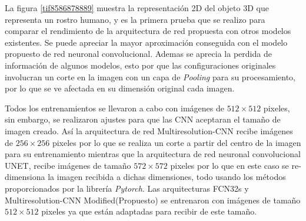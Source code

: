 \documentclass[10pt,letterpaper]{article}
\begin{document}
La figura \ref{tif8586878889} muestra la representación 2D del objeto 3D que representa un rostro humano, y es la primera prueba que se realizo para comparar el rendimiento de la arquitectura de red propuesta con otros modelos existentes. Se puede apreciar la mayor aproximación conseguida con el modelo propuesto de red neuronal convolucional. Ademas se aprecia la perdida de información de algunos modelos, esto por que las configuraciones originales involucran un corte en la imagen con un capa de \textit{Pooling} para su procesamiento, por lo que se ve afectada en su dimensión original cada imagen. 

Todos los entrenamientos se llevaron a cabo con imágenes de $512 \times 512$ pixeles, sin embargo, se realizaron ajustes para que las CNN aceptaran el tamaño de imagen creado. Así la arquitectura de red Multiresolution-CNN\cite{Sun:Yu} recibe imágenes de $256 \times 256$ pixeles por lo que se realiza un corte a partir del centro de la imagen para su entrenamiento mientras que la arquitectura de red neuronal convolucional UNET\cite{Ronn:Fisc}, recibe imágenes de tamaño $572 \times 572$ pixeles por lo que en este caso se re-dimensiona la imagen recibida a dichas dimensiones, todo usando los métodos proporcionados por la librería \textit{Pytorch}. Las arquitecturas FCN32s\cite{Long:Shel} y Multiresolution-CNN Modified(Propuesto) se entrenaron con imágenes de tamaño $512 \times 512$ pixeles ya que están adaptadas para recibir de este tamaño.
\end{document}
